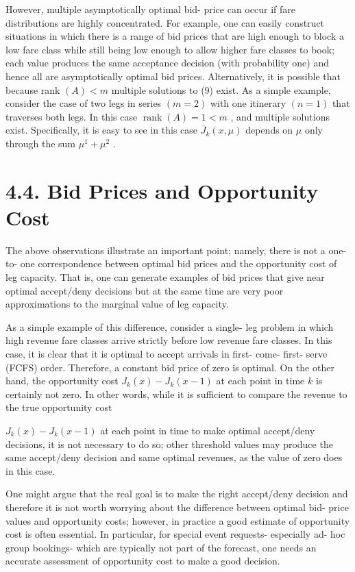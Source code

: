 However, multiple asymptotically optimal bid- price can occur if fare
distributions are highly concentrated. For example, one can easily
construct situations in which there is a range of bid prices that are
high enough to block a low fare class while still being low enough to
allow higher fare classes to book; each value produces the same
acceptance decision (with probability one) and hence all are
asymptotically optimal bid prices. Alternatively, it is possible that
because rank \((A)< m\) multiple solutions to (9) exist. As a simple
example, consider the case of two legs in series \((m = 2)\) with one
itinerary \((n = 1)\) that traverses both legs. In this case
\(\operatorname {rank}(A) = 1< m\) , and multiple solutions exist.
Specifically, it is easy to see in this case \(\overline{J}_{k}(x,\mu)\)
depends on \(\mu\) only through the sum \(\mu^{1} + \mu^{2}\) .

\section{4.4. Bid Prices and Opportunity
Cost}\label{bid-prices-and-opportunity-cost}

The above observations illustrate an important point; namely, there is
not a one- to- one correspondence between optimal bid prices and the
opportunity cost of leg capacity. That is, one can generate examples of
bid prices that give near optimal accept/deny decisions but at the same
time are very poor approximations to the marginal value of leg capacity.

As a simple example of this difference, consider a single- leg problem
in which high revenue fare classes arrive strictly before low revenue
fare classes. In this case, it is clear that it is optimal to accept
arrivals in first- come- first- serve (FCFS) order. Therefore, a
constant bid price of zero is optimal. On the other hand, the
opportunity cost \(J_{k}(x) - J_{k}(x - 1)\) at each point in time \(k\)
is certainly not zero. In other words, while it is sufficient to compare
the revenue to the true opportunity cost

\(J_{k}(x) - J_{k}(x - 1)\) at each point in time to make optimal
accept/deny decisions, it is not necessary to do so; other threshold
values may produce the same accept/deny decision and same optimal
revenues, as the value of zero does in this case.

One might argue that the real goal is to make the right accept/deny
decision and therefore it is not worth worrying about the difference
between optimal bid- price values and opportunity costs; however, in
practice a good estimate of opportunity cost is often essential. In
particular, for special event requests- especially ad- hoc group
bookings- which are typically not part of the forecast, one needs an
accurate assessment of opportunity cost to make a good decision.

